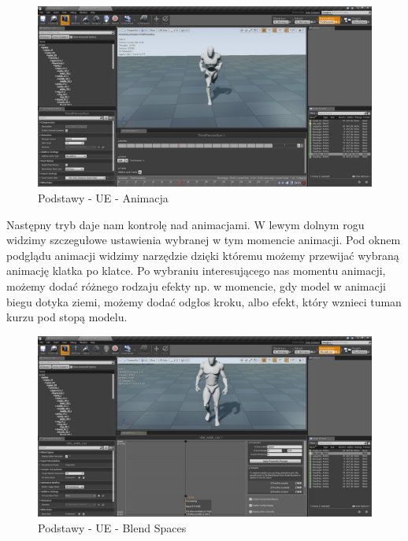 \documentclass[brudnopis]{xmgr}
\begin{document}
\newpage
\begin{figure}[!htb]
    \begin{center}
    \includegraphics[scale=0.25]{Screeny/Animation}
    \end{center}
    \caption{Podstawy - UE - Animacja}
\end{figure}

Następny tryb daje nam kontrolę nad animacjami. W lewym dolnym rogu widzimy szczegułowe ustawienia wybranej w tym momencie animacji.
Pod oknem podglądu animacji widzimy narzędzie dzięki któremu możemy przewijać wybraną animację klatka po klatce. Po wybraniu interesującego nas momentu animacji, możemy dodać różnego rodzaju efekty np. w momencie, gdy model w animacji biegu dotyka ziemi, możemy dodać odgłos kroku, albo efekt, który wznieci tuman kurzu pod stopą modelu.

\begin{figure}[!htb]
    \begin{center}
    \includegraphics[scale=0.25]{Screeny/Blend_Space}
    \end{center}
    \caption{Podstawy - UE - Blend Spaces}
\end{figure}
\end{document}
